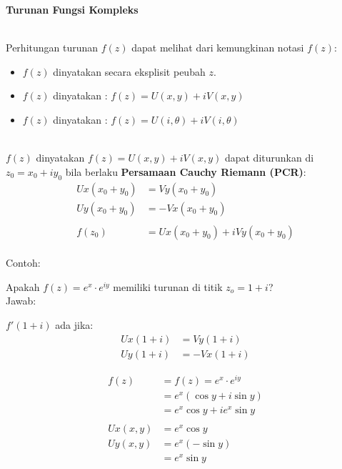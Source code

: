 \documentclass{article}
\begin{document}
    \begin{center}
        \textbf{Turunan Fungsi Kompleks}
    \end{center}
    \leavevmode\\

    Perhitungan turunan $f(z)$ dapat melihat dari kemungkinan notasi $f(z)$:
    \begin{itemize}
        \item $f(z)$ dinyatakan secara eksplisit peubah $z$.
        \item $f(z)$ dinyatakan : $f(z) = U(x,y) + iV(x,y)$
        \item $f(z)$ dinyatakan : $f(z) = U(i,\theta)+ iV(i,\theta)$
    \end{itemize}
    \leavevmode\\

    $f(z)$ dinyatakan $f(z) = U(x,y) + iV(x,y)$ dapat diturunkan di $z_0 = x_0 + iy_0$ bila berlaku \textbf{Persamaan Cauchy Riemann (PCR)}:\\
    \begin{align}
        Ux (x_0 + y_0)  &= Vy (x_0 + y_0)
        \nonumber\\
        Uy (x_0 + y_0)  &= -Vx (x_0 + y_0)
        \nonumber\\
        \nonumber\\
                f(z_0)  &= Ux (x_0 + y_0) + i Vy (x_0 + y_0)
    \end{align}
    \leavevmode\\

    \newpage
    Contoh:

    Apakah $f(z)=e^x \cdot e^{iy}$ memiliki turunan di titik $z_o = 1+i$?\\
    
    Jawab:
    
    $f'(1+i)$ ada jika:
    \begin{align}
        Ux(1+i) &= Vy(1+i)
        \nonumber\\
        Uy(1+i) &= -Vx(1+i)
        \nonumber
    \end{align}
    
    \begin{align}
        f(z)    &= f(z)=e^x \cdot e^{iy}
                \nonumber\\
                &= e^x(\cos y + i \sin y)
                \nonumber\\
                &= e^x \cos y + i e^x \sin y
                \nonumber\\
                \nonumber\\
        Ux(x,y) &= e^x \cos y
                \nonumber\\
        Uy(x,y) &= e^x (-\sin y)
                \nonumber\\
                &= e^x \sin y
                \nonumber\\
                \nonumber
    \end{align}
\end{document}
